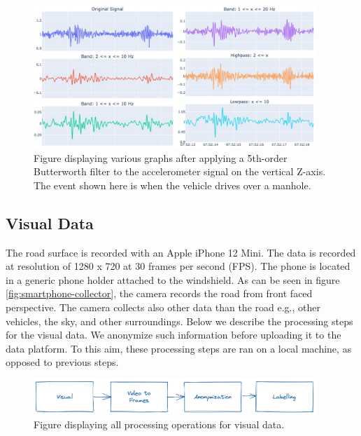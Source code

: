 \begin{figure}[H]
\begin{center}
\includegraphics[width=0.95\textwidth,keepaspectratio]{images/4_data/filter-example.jpg}
\end{center}
\captionsetup{width=.90\textwidth}
\caption{Figure displaying various graphs after applying a 5th-order Butterworth filter to the accelerometer signal on the vertical Z-axis. The event shown here is when the vehicle drives over a manhole.}
\label{fig:filter}
\end{figure}




\subsection{Visual Data}
\label{sec:visual-data}

The road surface is recorded with an Apple iPhone 12 Mini. The data is recorded at resolution of 1280 x 720 at 30 frames per second (FPS). The phone is located in a generic  phone holder attached to the windshield. As can be seen in figure \ref{fig:smartphone-collector}, the camera records the road from front faced perspective. The camera collects also other data than the road e.g., other vehicles, the sky, and other surroundings. Below we describe the processing steps for the visual data. We anonymize such information before uploading it to the data platform. To this aim, these processing steps are ran on a local machine, as opposed to previous steps.

\begin{figure}[H]
\begin{center}
\includegraphics[width=0.95\textwidth,keepaspectratio]{images/4_data/visual-processing-steps.png}
\end{center}
\captionsetup{width=.90\textwidth}
\caption{Figure displaying all processing operations for visual data.}
\label{fig:processing-overview}
\end{figure}


